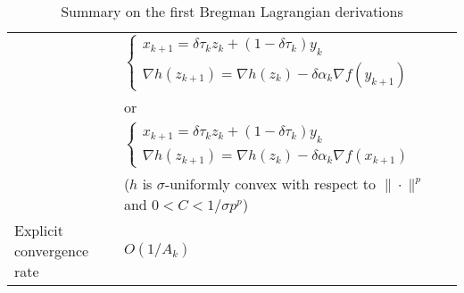 \begin{table}[ht]
\begin{tabular}{|l|l|}
                                    & $    \begin{cases}
                                                   x_{k+1} = \delta\tau_kz_k + (1-\delta\tau_k)y_k \\
                                                   \nabla h(z_{k+1}) = \nabla h(z_{k}) - \delta\alpha_k \nabla f(y_{k+1})
                                               \end{cases}$                                                                                                 \\
                                    & or                                                                                                                                                                         \\

                                    & $\begin{cases}
                                               x_{k+1} = \delta\tau_kz_k + (1-\delta\tau_k)y_k \\
                                               \nabla h(z_{k+1}) = \nabla h(z_{k}) - \delta\alpha_k \nabla f(x_{k+1})
                                           \end{cases}$                                                                                                     \\
                                    & ($h$ is $\sigma$-uniformly convex with respect to $\|\cdot\|^p$ and $0 < C < 1/\sigma p^p$)                                                                                \\
        \hline
        Explicit convergence rate   & $O\left(1/A_k\right)    $                                                                                                                                                  \\
        \hline
    \end{tabular}
    \caption{Summary on the first Bregman Lagrangian derivations}
    \label{table:1st-bregman}
\end{table}


